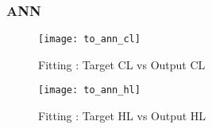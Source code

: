   \subsubsection{ANN}
  \begin{figure}[h!]
      \centering
      \texttt{[image: to\_ann\_cl]}
      \caption{Fitting : Target CL vs Output CL}
      \label{fig:to_ann_cl}                    
  \end{figure}
  \begin{figure}[h!]
      \centering
      \texttt{[image: to\_ann\_hl]}
      \caption{Fitting : Target HL vs Output HL}
      \label{fig:to_ann_hl}                    
  \end{figure}
  
